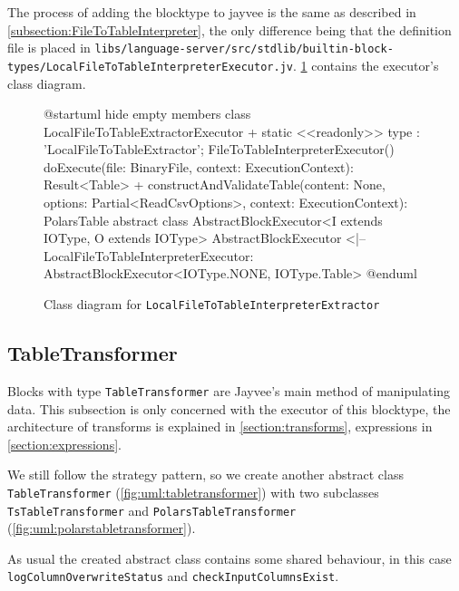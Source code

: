 The process of adding the blocktype to jayvee is the same as described in \ref{subsection:FileToTableInterpreter},
the only difference being that the definition file is placed in \Verb|libs/language-server/src/stdlib/builtin-block-types/LocalFileToTableInterpreterExecutor.jv|.
\ref{fig:uml:localfiletotableinterpreter} contains the executor's class diagram.

\begin{figure}
	\begin{plantuml}
		@startuml
		hide empty members
		class LocalFileToTableExtractorExecutor {
		+ {static} <<readonly>> type : 'LocalFileToTableExtractor';
		FileToTableInterpreterExecutor()
		doExecute(file: BinaryFile, context: ExecutionContext): Result<Table>
		+ constructAndValidateTable(content: None, options: Partial<ReadCsvOptions>, context: ExecutionContext): PolarsTable
		}
		abstract class AbstractBlockExecutor<I extends IOType, O extends IOType>
		AbstractBlockExecutor <|-- LocalFileToTableInterpreterExecutor: AbstractBlockExecutor<IOType.NONE, IOType.Table>
		@enduml
	\end{plantuml}
	\caption{Class diagram for \Verb|LocalFileToTableInterpreterExtractor|}
	\label{fig:uml:localfiletotableinterpreter}
\end{figure}

\subsection{TableTransformer}
Blocks with type \Verb|TableTransformer| are Jayvee's main method of manipulating data.
This subsection is only concerned with the executor of this blocktype, the architecture of transforms is explained in \ref{section:transforms}, expressions in \ref{section:expressions}.

We still follow the strategy pattern, so we create another abstract class \Verb|TableTransformer| (\ref{fig:uml:tabletransformer}) with two subclasses \Verb|TsTableTransformer| and \Verb|PolarsTableTransformer| (\ref{fig:uml:polarstabletransformer}).

As usual the created abstract class contains some shared behaviour, in this case \Verb|logColumnOverwriteStatus| and \Verb|checkInputColumnsExist|.

